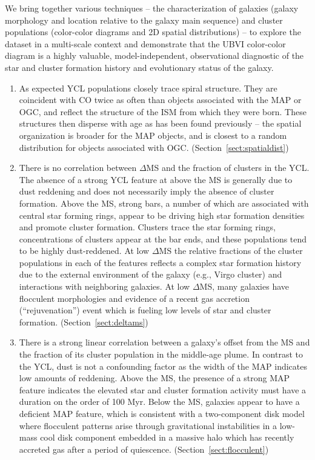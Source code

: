 \documentclass[]{aastex631}
\begin{document}
We bring together various techniques -- the characterization of galaxies (galaxy morphology and location relative to the galaxy main sequence) and cluster populations (color-color diagrams and 2D spatial distributions) -- to explore the dataset in a multi-scale context and demonstrate that the UBVI color-color diagram is a highly valuable, model-independent, observational diagnostic of the star and cluster formation history and evolutionary status of the galaxy.
\begin{enumerate}
\item As expected YCL populations closely trace spiral structure.  They are coincident with CO twice as often than objects associated with the MAP or OGC, and reflect the structure of the ISM from which they were born. These structures then disperse with age as has been found previously -- the spatial organization is broader for the MAP objects, and is closest to a random distribution for objects associated with OGC.  (Section~\ref{sect:spatialdist})

\item There is no correlation between $\Delta$MS and the fraction of clusters in the YCL. The absence of a strong YCL feature at above the MS is generally due to dust reddening and does not necessarily imply the absence of cluster formation.  Above the MS, strong bars, a number of which are associated with central star forming rings, appear to be driving high star formation densities and promote cluster formation. Clusters trace the star forming rings, concentrations of clusters appear at the bar ends, and these populations tend to be highly dust-reddened.  At low $\Delta$MS the relative fractions of the cluster populations in each of the features reflects a complex star formation history due to the external environment of the galaxy (e.g., Virgo cluster) and interactions with neighboring galaxies.  At low $\Delta$MS, many galaxies have flocculent morphologies and evidence of a recent gas accretion (``rejuvenation'') event which is fueling low levels of star and cluster formation.  (Section~\ref{sect:deltams})
\item  There is a strong linear correlation between a galaxy's offset from the MS and the fraction of its cluster population in the middle-age plume.  In contrast to the YCL, dust is not a confounding factor as the width of the MAP indicates low amounts of reddening.  Above the MS, the presence of a strong MAP feature indicates the elevated star and cluster formation activity must have a duration on the order of 100 Myr.  Below the MS, galaxies appear to have a deficient MAP feature, which is consistent with a two-component disk model where flocculent patterns arise through gravitational instabilities in a low-mass cool disk component embedded in
a massive halo which has recently accreted gas after a period of quiescence.    (Section~\ref{sect:flocculent})
\end{enumerate}
\end{document}
